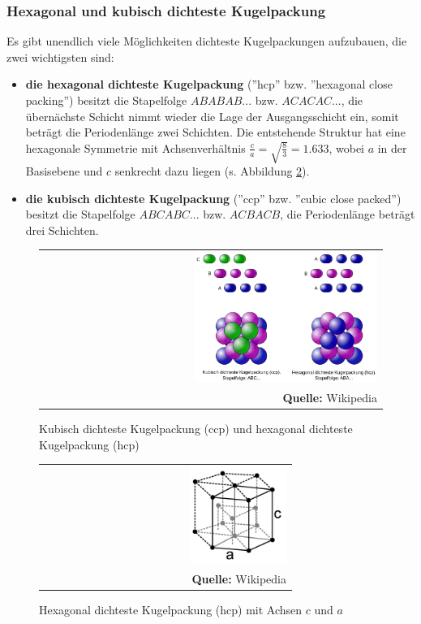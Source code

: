 \documentclass[a4paper,titlepage]{scrartcl}
\numberwithin{equation}{section}
\begin{document}
\subsubsection{Hexagonal und kubisch dichteste Kugelpackung}
Es gibt unendlich viele Möglichkeiten dichteste Kugelpackungen aufzubauen, die zwei wichtigsten sind:
\begin{itemize}
\item \textbf{die hexagonal dichteste Kugelpackung} (''hcp'' bzw. ''hexagonal close packing'') besitzt die Stapelfolge $ABABAB...$ bzw. $ACACAC...$, die übernächste Schicht nimmt wieder die Lage der Ausgangsschicht ein, somit beträgt die Periodenlänge zwei Schichten. Die entstehende Struktur hat eine hexagonale Symmetrie mit Achsenverhältnis $\frac{c}{a}=\sqrt{\frac{8}{3}}=1.633$, wobei $a$ in der Basisebene und $c$ senkrecht dazu liegen (s. Abbildung \ref{fig:hexagonalkugel}).
\item \textbf{die kubisch dichteste Kugelpackung} (''ccp'' bzw. ''cubic close packed'') besitzt die Stapelfolge $ABCABC...$ bzw. $ACBACB$, die Periodenlänge beträgt drei Schichten.
\end{itemize}
\begin{figure}[H]
	\centering
	\begin{tabular}{@{}r@{}}
		\includegraphics[width=0.55\textwidth]{DichtesteKugelpackung.png}\\
		\footnotesize\sffamily\textbf{Quelle:} Wikipedia \cite{wiki:kugelpackung}
	\end{tabular}
	\caption{Kubisch dichteste Kugelpackung (ccp) und hexagonal dichteste Kugelpackung (hcp)}
    \label{fig:dichtestepackung}
\end{figure}
\begin{figure}[H]
\centering
	\begin{tabular}{@{}r@{}}
		\includegraphics[width=0.4\textwidth]{hexagonalkugelpackung.png}\\
		\footnotesize\sffamily\textbf{Quelle:} Wikipedia
	\end{tabular}
	\caption{Hexagonal dichteste Kugelpackung (hcp) mit Achsen $c$ und $a$}
    \label{fig:hexagonalkugel}
\end{figure}
\end{document}
